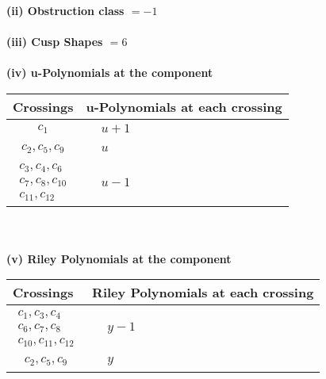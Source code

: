 \documentclass[1p]{elsarticle_modified}
\theoremstyle{definition}
\begin{document}
\flushleft \textbf{(ii) Obstruction class $= -1$}\\~\\
\flushleft \textbf{(iii) Cusp Shapes $= 6$}\\~\\
\newpage\renewcommand{\arraystretch}{1}
\flushleft \textbf{(iv) u-Polynomials at the component}\newline \\
\begin{tabular}{m{50pt}|m{274pt}}
Crossings & \hspace{64pt}u-Polynomials at each crossing \\
\hline $$\begin{aligned}c_{1}\end{aligned}$$&$\begin{aligned}
&u+1
\end{aligned}$\\
\hline $$\begin{aligned}c_{2},c_{5},c_{9}\end{aligned}$$&$\begin{aligned}
&u
\end{aligned}$\\
\hline $$\begin{aligned}c_{3},c_{4},c_{6}\\c_{7},c_{8},c_{10}\\c_{11},c_{12}\end{aligned}$$&$\begin{aligned}
&u-1
\end{aligned}$\\
\hline
\end{tabular}\\~\\
\newpage\renewcommand{\arraystretch}{1}
\flushleft \textbf{(v) Riley Polynomials at the component}\newline \\
\begin{tabular}{m{50pt}|m{274pt}}
Crossings & \hspace{64pt}Riley Polynomials at each crossing \\
\hline $$\begin{aligned}c_{1},c_{3},c_{4}\\c_{6},c_{7},c_{8}\\c_{10},c_{11},c_{12}\end{aligned}$$&$\begin{aligned}
&y-1
\end{aligned}$\\
\hline $$\begin{aligned}c_{2},c_{5},c_{9}\end{aligned}$$&$\begin{aligned}
&y
\end{aligned}$\\
\hline
\end{tabular}\\~\\
\end{document}
